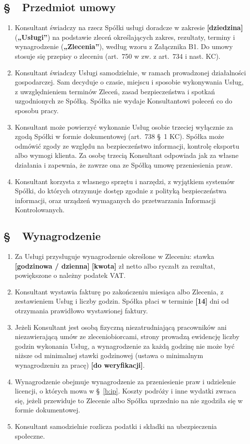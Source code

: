 \documentclass[11pt,a4paper]{report}
\newcounter{paragraf}
\newcommand{\paragraf}[1]{%
  \refstepcounter{paragraf}%
  \Needspace{5\baselineskip}%
  \subsection*{\S~\theparagraf\ #1}%
}
\newenvironment{ContractClause}[1]{\paragraf{#1}}{\par}
\newcommand{\field}[1]{\textbf{[#1]}}
\begin{document}
\begin{ContractClause}{Przedmiot umowy}
\begin{enumerate}
  \item Konsultant świadczy na rzecz Spółki usługi doradcze w zakresie \field{dziedzina} (\textbf{„Usługi”}) na podstawie zleceń określających zakres, rezultaty, terminy i wynagrodzenie (\textbf{„Zlecenia”}), według wzoru z Załącznika B1. Do umowy stosuje się przepisy o zleceniu (art.~750 w zw. z art.~734 i nast. KC).
  \item Konsultant świadczy Usługi samodzielnie, w ramach prowadzonej działalności gospodarczej. Sam decyduje o czasie, miejscu i sposobie wykonywania Usług, z uwzględnieniem terminów Zleceń, zasad bezpieczeństwa i spotkań uzgodnionych ze Spółką. Spółka nie wydaje Konsultantowi poleceń co do sposobu pracy.
  \item Konsultant może powierzyć wykonanie Usług osobie trzeciej wyłącznie za zgodą Spółki w formie dokumentowej (art.~738 §~1 KC). Spółka może odmówić zgody ze względu na bezpieczeństwo informacji, kontrolę eksportu albo wymogi klienta. Za osobę trzecią Konsultant odpowiada jak za własne działania i zapewnia, że zawrze ona ze Spółką umowę przeniesienia praw.
  \item Konsultant korzysta z własnego sprzętu i narzędzi, z wyjątkiem systemów Spółki, do których otrzymuje dostęp zgodnie z polityką bezpieczeństwa informacji, oraz urządzeń wymaganych do przetwarzania Informacji Kontrolowanych.
\end{enumerate}
\end{ContractClause}

\begin{ContractClause}{Wynagrodzenie}
\begin{enumerate}
  \item Za Usługi przysługuje wynagrodzenie określone w Zleceniu: stawka \field{godzinowa / dzienna} \field{kwota} zł netto albo ryczałt za rezultat, powiększone o należny podatek VAT.
  \item Konsultant wystawia fakturę po zakończeniu miesiąca albo Zlecenia, z zestawieniem Usług i liczby godzin. Spółka płaci w terminie \field{14} dni od otrzymania prawidłowo wystawionej faktury.
  \item Jeżeli Konsultant jest osobą fizyczną niezatrudniającą pracowników ani niezawierającą umów ze zleceniobiorcami, strony prowadzą ewidencję liczby godzin wykonania Usług, a wynagrodzenie za każdą godzinę nie może być niższe od minimalnej stawki godzinowej (ustawa o minimalnym wynagrodzeniu za pracę) \field{do weryfikacji}.
  \item Wynagrodzenie obejmuje wynagrodzenie za przeniesienie praw i udzielenie licencji, o których mowa w §~\ref{b:ip}. Koszty podróży i inne wydatki zwraca się, jeżeli przewiduje to Zlecenie albo Spółka uprzednio na nie zgodziła się w formie dokumentowej.
  \item Konsultant samodzielnie rozlicza podatki i składki na ubezpieczenia społeczne.
\end{enumerate}
\end{ContractClause}
\end{document}
